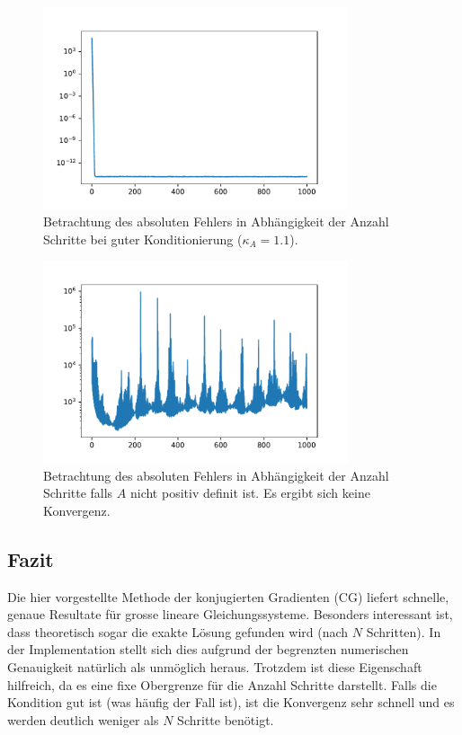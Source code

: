 \begin{figure}	
	\centering
	\includegraphics[width=0.8\textwidth]{papers/cg/images/convergence_k_1_1}
	\caption{Betrachtung des absoluten Fehlers in Abhängigkeit der Anzahl Schritte bei guter Konditionierung ($\kappa_A=1.1$).}
	\label{cg:abb:fast_conv}
\end{figure}

\begin{figure}	
	\centering
	\includegraphics[width=0.8\textwidth]{papers/cg/images/no_convergence}
	\caption{Betrachtung des absoluten Fehlers in Abhängigkeit der Anzahl Schritte falls $A$ nicht positiv definit ist. 
			Es ergibt sich keine Konvergenz.}
	\label{cg:abb:no_conv}
\end{figure}

\subsection{Fazit}
Die hier vorgestellte Methode der konjugierten Gradienten (CG) liefert schnelle, genaue Resultate für grosse lineare Gleichungssysteme.
Besonders interessant ist, dass theoretisch sogar die exakte Lösung gefunden wird (nach $N$ Schritten).
In der Implementation stellt sich dies aufgrund der begrenzten numerischen Genauigkeit natürlich als unmöglich heraus.
Trotzdem ist diese Eigenschaft hilfreich, da es eine fixe Obergrenze für die Anzahl Schritte darstellt.
Falls die Kondition gut ist (was häufig der Fall ist), ist die Konvergenz sehr schnell und es werden deutlich weniger als $N$ Schritte benötigt.